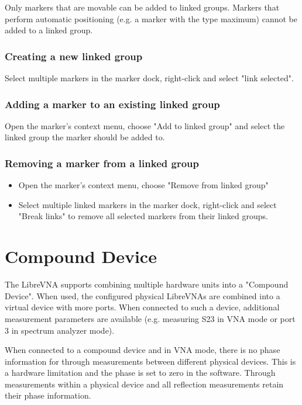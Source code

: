 \documentclass[a4paper,11pt]{article}
\newcommand\danger[1][5ex]{%
  \renewcommand\stacktype{L}%
  \scaleto{\stackon[1.3pt]{\color{red}$\triangle$}{\tiny !}}{#1}%
}
\newenvironment{important}[1][]{%
   \begin{mdframed}[%
      backgroundcolor={red!15}, hidealllines=true,
      skipabove=0.7\baselineskip, skipbelow=0.7\baselineskip,
      splitbottomskip=2pt, splittopskip=4pt, #1]%
   \makebox[0pt]{%
      \smash{%
         \hspace*{-45pt}%
         \raisebox{-5pt}{%
            {\danger}%
         }%
      }%
   }%
}{\end{mdframed}}
\begin{document}
Only markers that are movable can be added to linked groups. Markers that perform automatic positioning (e.g. a marker with the type maximum) cannot be added to a linked group.

\subsubsection{Creating a new linked group}
Select multiple markers in the marker dock, right-click and select "link selected".
\subsubsection{Adding a marker to an existing linked group}
Open the marker's context menu, choose "Add to linked group" and select the linked group the marker should be added to.
\subsubsection{Removing a marker from a linked group}
\begin{itemize}
\item Open the marker's context menu, choose "Remove from linked group"
\item Select multiple linked markers in the marker dock, right-click and select "Break links" to remove all selected markers from their linked groups.
\end{itemize}

\section{Compound Device}
The LibreVNA supports combining multiple hardware units into a "Compound Device". When used, the configured physical LibreVNAs are combined into a virtual device with more ports. When connected to such a device, additional measurement parameters are available (e.g. measuring S23 in VNA mode or port 3 in spectrum analyzer mode).

\begin{important}
When connected to a compound device and in VNA mode, there is no phase information for through measurements between different physical devices. This is a hardware limitation and the phase is set to zero in the software. Through measurements within a physical device and all reflection measurements retain their phase information.
\end{important}
\end{document}
